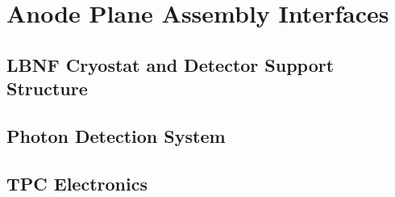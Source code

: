 \chapter{Anode Plane Assembly Interfaces}
\label{ch:fdsp-apa-intfc}


\section{LBNF Cryostat and Detector Support Structure}
\label{sec:fdsp-apa-intfc-lbnf-dss}


\section{Photon Detection System}
\label{sec:fdsp-apa-intfc-pds}


\section{TPC Electronics}
\label{sec:fdsp-apa-intfc-elec}




